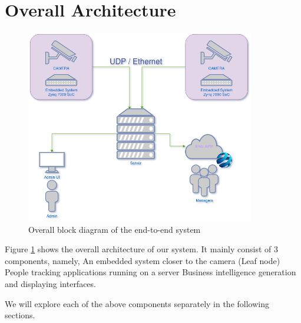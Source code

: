 \documentclass[12pt,a4paper]{report}
\begin{document}
\section{Overall Architecture}
\begin{figure}[H]
\includegraphics[width=10cm]{overall_block.png}
\centering
\caption{Overall block diagram of the end-to-end system}
\label{overall}
\end{figure}

Figure \ref{overall} shows the overall architecture of our system. It mainly consist of 3 components, namely,
An embedded system closer to the camera (Leaf node)
People tracking applications running on a server 
Business intelligence generation and displaying interfaces. 

We will explore each of the above components separately in the following sections.
\end{document}
